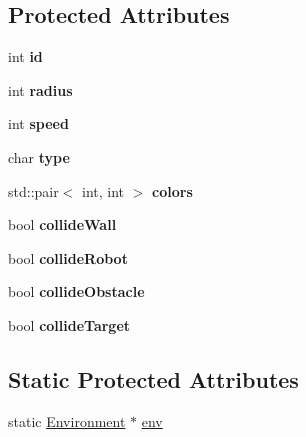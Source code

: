 \subsection*{Protected Attributes}
\begin{DoxyCompactItemize}
\item 
\hypertarget{classBaseObject_ab21889ef86ffc1849898d2613ccdc75f}{int {\bfseries id}}\label{classBaseObject_ab21889ef86ffc1849898d2613ccdc75f}

\item 
\hypertarget{classBaseObject_a4bd0bd6f8e263af7621ec80b47ebbad1}{int {\bfseries radius}}\label{classBaseObject_a4bd0bd6f8e263af7621ec80b47ebbad1}

\item 
\hypertarget{classBaseObject_a77eb913a6f92fc275fdcc679d2377ed8}{int {\bfseries speed}}\label{classBaseObject_a77eb913a6f92fc275fdcc679d2377ed8}

\item 
\hypertarget{classBaseObject_acde20ad83b864b997b2e81b29303d25b}{char {\bfseries type}}\label{classBaseObject_acde20ad83b864b997b2e81b29303d25b}

\item 
\hypertarget{classBaseObject_a4e59f6ee35255ef92325f0edcd849e25}{std\-::pair$<$ int, int $>$ {\bfseries colors}}\label{classBaseObject_a4e59f6ee35255ef92325f0edcd849e25}

\item 
\hypertarget{classBaseObject_a16bede1971c3e62957ca033fd521ca8b}{bool {\bfseries collide\-Wall}}\label{classBaseObject_a16bede1971c3e62957ca033fd521ca8b}

\item 
\hypertarget{classBaseObject_ad22a16beb1d41db1107bef67e2346583}{bool {\bfseries collide\-Robot}}\label{classBaseObject_ad22a16beb1d41db1107bef67e2346583}

\item 
\hypertarget{classBaseObject_a7439c5dfdc2078ecccaaf820b3b0f521}{bool {\bfseries collide\-Obstacle}}\label{classBaseObject_a7439c5dfdc2078ecccaaf820b3b0f521}

\item 
\hypertarget{classBaseObject_a9ac15037c8c2b321eb746957306d43f2}{bool {\bfseries collide\-Target}}\label{classBaseObject_a9ac15037c8c2b321eb746957306d43f2}

\end{DoxyCompactItemize}
\subsection*{Static Protected Attributes}
\begin{DoxyCompactItemize}
\item 
static \hyperlink{classEnvironment}{Environment} $\ast$ \hyperlink{classBaseObject_adf47773f2b71699caa9560be64ccfbbe}{env}
\end{DoxyCompactItemize}


